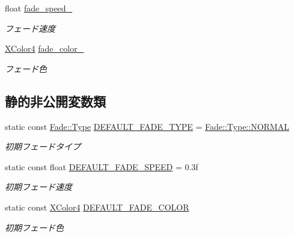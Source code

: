 \begin{DoxyCompactItemize}
float \mbox{\hyperlink{class_scene_manager_a8c54bc4de81209cb1576337bbbe45a6b}{fade\+\_\+speed\+\_\+}}
\begin{DoxyCompactList}\small\item\em フェード速度 \end{DoxyCompactList}\item 
\mbox{\hyperlink{_vector3_d_8h_a680c30c4a07d86fe763c7e01169cd6cc}{X\+Color4}} \mbox{\hyperlink{class_scene_manager_a978b815258c4591f81a16995484fe9fb}{fade\+\_\+color\+\_\+}}
\begin{DoxyCompactList}\small\item\em フェード色 \end{DoxyCompactList}\end{DoxyCompactItemize}
\subsection*{静的非公開変数類}
\begin{DoxyCompactItemize}
\item 
static const \mbox{\hyperlink{class_fade_ac06f27215b454aa05b93c236476d6e80}{Fade\+::\+Type}} \mbox{\hyperlink{class_scene_manager_ab87f30ef7e11305bb4e3400b41225c22}{D\+E\+F\+A\+U\+L\+T\+\_\+\+F\+A\+D\+E\+\_\+\+T\+Y\+PE}} = \mbox{\hyperlink{class_fade_ac06f27215b454aa05b93c236476d6e80a1e23852820b9154316c7c06e2b7ba051}{Fade\+::\+Type\+::\+N\+O\+R\+M\+AL}}
\begin{DoxyCompactList}\small\item\em 初期フェードタイプ \end{DoxyCompactList}\item 
static const float \mbox{\hyperlink{class_scene_manager_a58cd446096f95d3e62e7eba16a4096ee}{D\+E\+F\+A\+U\+L\+T\+\_\+\+F\+A\+D\+E\+\_\+\+S\+P\+E\+ED}} = 0.\+3f
\begin{DoxyCompactList}\small\item\em 初期フェード速度 \end{DoxyCompactList}\item 
static const \mbox{\hyperlink{_vector3_d_8h_a680c30c4a07d86fe763c7e01169cd6cc}{X\+Color4}} \mbox{\hyperlink{class_scene_manager_a8b6874644ba8998b0db76780d56f371f}{D\+E\+F\+A\+U\+L\+T\+\_\+\+F\+A\+D\+E\+\_\+\+C\+O\+L\+OR}}
\begin{DoxyCompactList}\small\item\em 初期フェード色 \end{DoxyCompactList}\end{DoxyCompactItemize}


